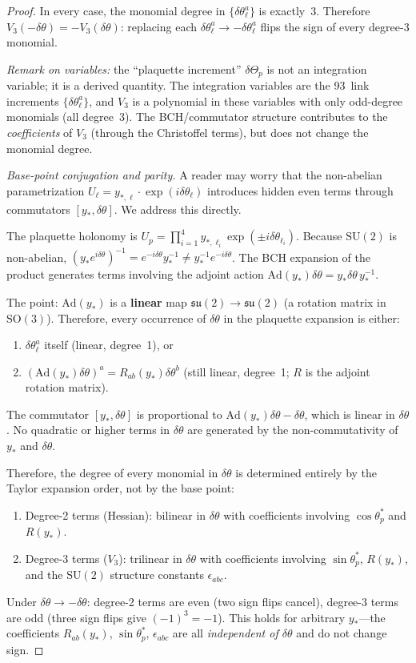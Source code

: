 \documentclass[11pt]{article}
\theoremstyle{definition}
\newcommand{\SU}{\mathrm{SU}}
\newcommand{\su}{\mathfrak{su}}
\newcommand{\SO}{\mathrm{SO}}
\begin{document}
\begin{proof}
In every case, the monomial degree in
$\{\delta\theta_\ell^a\}$ is exactly~3.  Therefore
$V_3(-\delta\theta)=-V_3(\delta\theta)$: replacing each
$\delta\theta_\ell^a\to -\delta\theta_\ell^a$ flips the sign
of every degree-3 monomial.

\emph{Remark on variables:} the ``plaquette
increment'' $\delta\Theta_p$ is not an integration variable;
it is a derived quantity.  The integration variables are the
93~link increments $\{\delta\theta_\ell^a\}$, and $V_3$ is a
polynomial in these variables with only odd-degree monomials
(all degree~3).  The BCH/commutator structure contributes to
the \emph{coefficients} of $V_3$ (through the Christoffel
terms), but does not change the monomial degree.

\emph{Base-point conjugation and parity.}
A reader may worry that the non-abelian parametrization
$U_\ell=y_{*,\ell}\cdot\exp(i\delta\theta_\ell)$ introduces
hidden even terms through commutators $[y_*,\delta\theta]$.
We address this directly.

The plaquette holonomy is $U_p=\prod_{i=1}^4
y_{*,\ell_i}\exp(\pm i\delta\theta_{\ell_i})$.
Because $\SU(2)$ is non-abelian,
$(y_*e^{i\delta\theta})^{-1}=e^{-i\delta\theta}y_*^{-1}
\ne y_*^{-1}e^{-i\delta\theta}$.
The BCH expansion of the product generates terms involving
the adjoint action $\mathrm{Ad}(y_*)\delta\theta
=y_*\delta\theta\,y_*^{-1}$.

The point: $\mathrm{Ad}(y_*)$ is a \textbf{linear} map
$\su(2)\to\su(2)$ (a rotation matrix in $\SO(3)$).
Therefore, every occurrence of $\delta\theta$ in the
plaquette expansion is either:
\begin{enumerate}[nosep,label=(\alph*)]
\item $\delta\theta_\ell^a$ itself (linear, degree~1), or
\item $(\mathrm{Ad}(y_*)\delta\theta)^a
=R_{ab}(y_*)\delta\theta^b$ (still linear, degree~1;
$R$ is the adjoint rotation matrix).
\end{enumerate}
The commutator $[y_*,\delta\theta]$ is proportional to
$\mathrm{Ad}(y_*)\delta\theta-\delta\theta$, which is
linear in $\delta\theta$.  No quadratic or
higher terms in $\delta\theta$ are generated by the
non-commutativity of $y_*$ and $\delta\theta$.

Therefore, the degree of every monomial in $\delta\theta$
is determined entirely by the Taylor expansion order,
not by the base point:
\begin{enumerate}[nosep,label=(\roman*)]
\item Degree-2 terms (Hessian): bilinear in $\delta\theta$
with coefficients involving $\cos\theta_p^*$ and $R(y_*)$.
\item Degree-3 terms ($V_3$): trilinear in $\delta\theta$
with coefficients involving $\sin\theta_p^*$, $R(y_*)$,
and the $\SU(2)$ structure constants $\epsilon_{abc}$.
\end{enumerate}
Under $\delta\theta\to-\delta\theta$: degree-2 terms are
even (two sign flips cancel), degree-3 terms are
odd (three sign flips give $(-1)^3=-1$).
This holds for arbitrary $y_*$---the coefficients
$R_{ab}(y_*)$, $\sin\theta_p^*$, $\epsilon_{abc}$ are
all \emph{independent of $\delta\theta$} and do not change
sign.


\end{proof}
\end{document}
